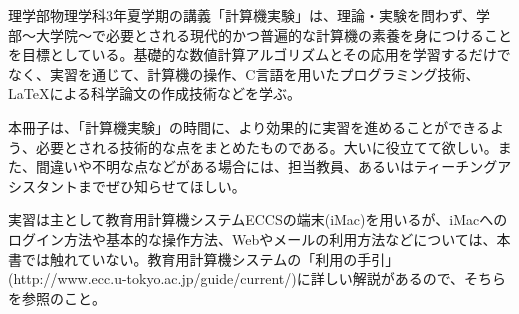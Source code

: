 
理学部物理学科3年夏学期の講義「計算機実験」は、理論・実験を問わず、学部〜大学院〜で必要とされる現代的かつ普遍的な計算機の素養を身につけることを目標としている。基礎的な数値計算アルゴリズムとその応用を学習するだけでなく、実習を通じて、計算機の操作、C言語を用いたプログラミング技術、\LaTeX による科学論文の作成技術などを学ぶ。

本冊子は、「計算機実験」の時間に、より効果的に実習を進めることができるよう、必要とされる技術的な点をまとめたものである。大いに役立てて欲しい。また、間違いや不明な点などがある場合には、担当教員、あるいはティーチングアシスタントまでぜひ知らせてほしい。

実習は主として教育用計算機システムECCSの端末(iMac)を用いるが、iMacへのログイン方法や基本的な操作方法、Webやメールの利用方法などについては、本書では触れていない。教育用計算機システムの「利用の手引」(http://www.ecc.u-tokyo.ac.jp/guide/current/)に詳しい解説があるので、そちらを参照のこと。






